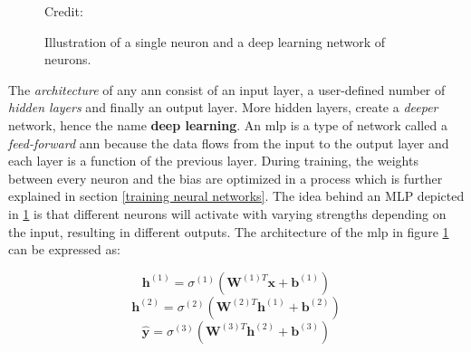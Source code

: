             \begin{figure}[H]
                \centering
                
        	
                
                \caption[The perceptron and multi-layer perceptron]{Illustration of a single neuron and a deep learning network of neurons.}
              	\medskip 
                \hspace*{15pt}\hbox{\scriptsize Credit: \citeauthor{razavi2021deep_exp_DL}\cite{razavi2021deep_exp_DL}}
                \label{Perceptron / MLP}
            \end{figure}
        
        The \textit{architecture} of any \gls{ann} consist of an input layer, a user-defined number of \textit{hidden layers} and finally an output layer\cite{razavi2021deep_exp_per}. More hidden layers, create a \textit{deeper} network, hence the name \textbf{deep learning}. An \gls{mlp} is a type of network called a \textit{feed-forward} \gls{ann} because the data flows from the input to the output layer and each layer is a function of the previous layer. During training, the weights between every neuron and the bias are optimized in a process which is further explained in section \ref{training neural networks}. The idea behind an MLP depicted in \ref{Perceptron / MLP} is that different neurons will activate with varying strengths depending on the input, resulting in different outputs. The architecture of the \gls{mlp} in figure \ref{Perceptron / MLP} can be expressed as\cite{Goodfellow-et-al-2016_architecture}:
        
        \begin{equation}
            \textbf{h}^{(1)} = \sigma^{(1)}(\textbf{W}^{(1)T}\textbf{x} + \textbf{b}^{(1)})
        \end{equation}
        \begin{equation}
            \textbf{h}^{(2)} = \sigma^{(2)}(\textbf{W}^{(2)T}\textbf{h}^{(1)} + \textbf{b}^{(2)})
        \end{equation}
        \begin{equation} \label{mlp outputlayer eq}
            \hat{\textbf{y}} = \sigma^{(3)}(\textbf{W}^{(3)T}\textbf{h}^{(2)} + \textbf{b}^{(3)})
        \end{equation}
        
